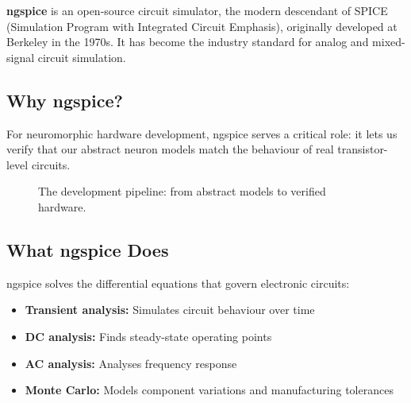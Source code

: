 \documentclass[11pt,a4paper]{article}
\begin{document}
\textbf{ngspice} is an open-source circuit simulator, the modern descendant of SPICE (Simulation Program with Integrated Circuit Emphasis), originally developed at Berkeley in the 1970s. It has become the industry standard for analog and mixed-signal circuit simulation.

\subsection{Why ngspice?}

For neuromorphic hardware development, ngspice serves a critical role: it lets us verify that our abstract neuron models match the behaviour of real transistor-level circuits.

\begin{figure}[H]
\centering
{}
\caption{The development pipeline: from abstract models to verified hardware.}
\end{figure}

\subsection{What ngspice Does}

ngspice solves the differential equations that govern electronic circuits:
\begin{itemize}
    \item \textbf{Transient analysis:} Simulates circuit behaviour over time
    \item \textbf{DC analysis:} Finds steady-state operating points
    \item \textbf{AC analysis:} Analyses frequency response
    \item \textbf{Monte Carlo:} Models component variations and manufacturing tolerances
\end{itemize}
\end{document}

